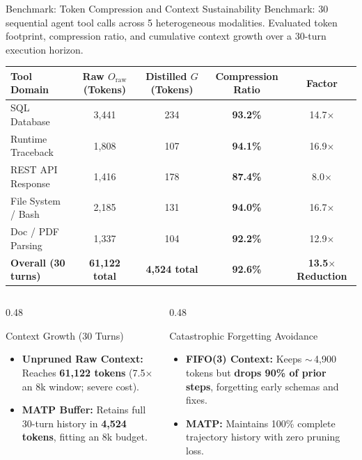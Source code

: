 \documentclass[aspectratio=169,10pt]{beamer}
\begin{document}
\begin{frame}{Benchmark: Token Compression and Context Sustainability}
  {\footnotesize Benchmark: 30 sequential agent tool calls across 5 heterogeneous modalities. Evaluated token footprint, compression ratio, and cumulative context growth over a 30-turn execution horizon.}

  \vspace{0.3em}
  \begin{table}
    \centering
    \footnotesize
    \begin{tabular}{lcccc}
      \toprule
      Tool Domain & Raw $O_{\mathrm{raw}}$ (Tokens) & Distilled $G$ (Tokens) & Compression Ratio & Factor\\
      \midrule
      SQL Database & 3,441 & 234 & \textbf{93.2\%} & 14.7$\times$\\
      Runtime Traceback & 1,808 & 107 & \textbf{94.1\%} & 16.9$\times$\\
      REST API Response & 1,416 & 178 & \textbf{87.4\%} & 8.0$\times$\\
      File System / Bash & 2,185 & 131 & \textbf{94.0\%} & 16.7$\times$\\
      Doc / PDF Parsing & 1,337 & 104 & \textbf{92.2\%} & 12.9$\times$\\
      \midrule
      \textbf{Overall (30 turns)} & \textbf{61,122 total} & \textbf{4,524 total} & \textbf{92.6\%} & \textbf{13.5$\times$ Reduction}\\
      \bottomrule
    \end{tabular}
  \end{table}

  \begin{columns}[T,onlytextwidth]
    \begin{column}{0.48\textwidth}
      \begin{block}{Context Growth (30 Turns)}
        \begin{itemize}
          \footnotesize
          \item \textbf{Unpruned Raw Context:} Reaches \textbf{61,122 tokens} (7.5$\times$ an 8k window; severe cost).
          \item \textbf{MATP Buffer:} Retains full 30-turn history in \textbf{4,524 tokens}, fitting an 8k budget.
        \end{itemize}
      \end{block}
    \end{column}
    \begin{column}{0.48\textwidth}
      \begin{block}{Catastrophic Forgetting Avoidance}
        \begin{itemize}
          \footnotesize
          \item \textbf{FIFO(3) Context:} Keeps $\sim$\,4,900 tokens but \textbf{drops 90\% of prior steps}, forgetting early schemas and fixes.
          \item \textbf{MATP:} Maintains 100\% complete trajectory history with zero pruning loss.
        \end{itemize}
      \end{block}
    \end{column}
  \end{columns}
\end{frame}
\end{document}
